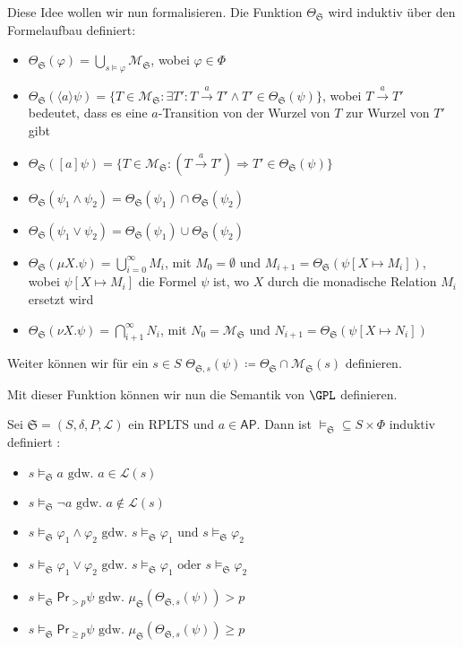 Diese Idee wollen wir nun formalisieren. Die Funktion $\Theta_\mathfrak{S}$ wird induktiv über den Formelaufbau definiert:
\begin{itemize}
	\item $\Theta_\mathfrak{S}(\varphi) = \bigcup_{s\models \varphi}\mathcal{M}_\mathfrak{S}$, wobei $\varphi\in \Phi$
	\item $\Theta_\mathfrak{S}(\langle a\rangle \psi) = \{T\in \mathcal{M}_\mathfrak{S} : \exists T' : T\xrightarrow{a}T' \land T'\in \Theta_\mathfrak{S}(\psi)\}$, wobei $T\xrightarrow{a}T'$ bedeutet, dass es eine $a$-Transition von der Wurzel von $T$ zur Wurzel von $T'$ gibt
	\item $\Theta_\mathfrak{S}([a]\psi) = \{T\in \mathcal{M}_\mathfrak{S} : (T\xrightarrow{a}T') \Rightarrow T'\in \Theta_\mathfrak{S}(\psi)\}$
	\item $\Theta_\mathfrak{S}(\psi_1\land \psi_2) = \Theta_\mathfrak{S}(\psi_1)\cap \Theta_\mathfrak{S}(\psi_2)$
	\item $\Theta_\mathfrak{S}(\psi_1\lor\psi_2) = \Theta_\mathfrak{S}(\psi_1) \cup \Theta_\mathfrak{S}(\psi_2)$
	\item $\Theta_\mathfrak{S}(\mu X.\psi) = \bigcup_{i=0}^\infty M_i$, mit $M_0=\emptyset$ und $M_{i+1} = \Theta_\mathfrak{S}(\psi[X\mapsto M_i])$, wobei $\psi[X\mapsto M_i]$ die Formel $\psi$ ist, wo $X$ durch die monadische Relation $M_i$ ersetzt wird
	\item $\Theta_\mathfrak{S}(\nu X.\psi) = \bigcap_{i+1}^\infty N_i$, mit $N_0=\mathcal{M}_\mathfrak{S}$ und $N_{i+1}=\Theta_\mathfrak{S}(\psi[X\mapsto N_i])$
\end{itemize}
Weiter können wir für ein $s\in S$ $\Theta_{\mathfrak{S},s}(\psi)\coloneqq \Theta_\mathfrak{S}\cap \mathcal{M}_\mathfrak{S}(s)$ definieren. \cite{cleaveland2005probabilistic}

Mit dieser Funktion können wir nun die Semantik von $\GPL$ definieren.
\begin{definition}
	Sei $\mathfrak{S}=(S,\delta,P,\mathcal{L})$ ein RPLTS und $a\in \mathsf{AP}$. Dann ist $\models_\mathfrak{S}\subseteq S\times \Phi$ induktiv definiert \cite{cleaveland2005probabilistic}:
	\begin{itemize}
		\item $s\models_\mathfrak{S} a\text{ gdw. }a\in \mathcal{L}(s)$
		\item $s\models_\mathfrak{S} \neg a\text{ gdw. }a\notin \mathcal{L}(s)$
		\item $s\models_\mathfrak{S} \varphi_1\land\varphi_2\text{ gdw. }s\models_\mathfrak{S}\varphi_1\text{ und }s\models_\mathfrak{S}\varphi_2$
		\item $s\models_\mathfrak{S} \varphi_1\lor\varphi_2\text{ gdw. }s\models_\mathfrak{S}\varphi_1\text{ oder }s\models_\mathfrak{S}\varphi_2$
		\item $s\models_\mathfrak{S} \mathsf{Pr}_{>p}\psi\text{ gdw. }\mu_\mathfrak{S}(\Theta_{\mathfrak{S},s}(\psi))>p$
		\item $s\models_\mathfrak{S} \mathsf{Pr}_{\geq p}\psi\text{ gdw. }\mu_\mathfrak{S}(\Theta_{\mathfrak{S},s}(\psi))\geq p$
	\end{itemize}
\end{definition}


